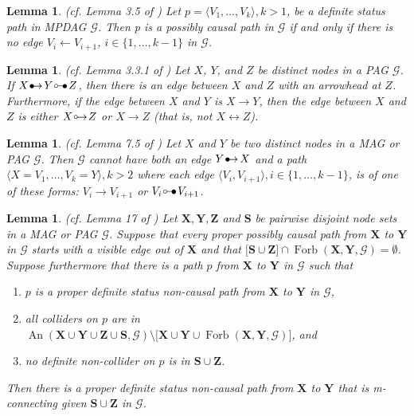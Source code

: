 \documentclass[twoside]{article}
\newtheorem{lemma}[theorem]{Lemma}
\DeclareMathOperator{\An}{An}
\DeclareMathOperator{\Forb}{Forb}
\newcommand{\fb}[2][X,Y]{\Forb(\mb{#1},#2)}
\newcommand{\mb}[1]{\mathbf{#1}}
\newcommand{\g}[1][G]{\mathcal{#1}}
\newcommand{\circbullet}{
  \setlength{\unitlength}{1mm}
  \begin{picture}(5,1)(0,0)
    \put(1,1){\circle{1}}
    \put(1.5,1){\line(1,0){2.4}}
    \put(2.9,0){$\bullet$}
  \end{picture}
}
\newcommand{\bulletarrow}{
  \setlength{\unitlength}{1mm}
  \begin{picture}(5,1)(0,0)
    \put(0.2,0){$\bullet$}
    \put(1,0){$\rightarrow$}
  \end{picture}
}
\newcommand{\circarrow}{
  \setlength{\unitlength}{1mm}
  \begin{picture}(5,1)(0,0)
    \put(1,1){\circle{1}}
    \put(1.2,0){$\rightarrow$}
  \end{picture}
}
\begin{document}
\begin{lemma}
\label{lem:perkovic17-35}
{\normalfont (cf. Lemma 3.5 of \citealp{perkovic2017interpreting})}
    Let $p = \langle V_1, \dots, V_k \rangle, k > 1$, be a definite status path in MPDAG $\g$. Then p is a possibly causal path in $\g$ if and only if there is no edge $V_i \leftarrow V_{i+1}$, $i \in \{1, \dots, k-1\}$ in $\g$.
\end{lemma}


\begin{lemma}
\label{lem:basic-property-pags}
{\normalfont (cf. Lemma 3.3.1 of \citealp{zhang2006causal})}
    Let $X$, $Y$, and $Z$ be distinct nodes in a PAG $\g$. If $X \bulletarrow Y \circbullet Z$, then there is an edge between $X$ and $Z$ with an arrowhead at $Z$. Furthermore, if the edge between $X$ and $Y$ is $X \rightarrow Y$, then the edge between $X$ and $Z$ is either $X \circarrow Z$ or $X \rightarrow Z$ (that is, not $X \leftrightarrow Z$).
\end{lemma}


\begin{lemma}
\label{lem:marl-cycle}
{\normalfont (cf. Lemma 7.5 of \citealp{maathuis2015generalized})}
    Let $X$ and $Y$ be two distinct nodes in a  MAG or PAG $\g$. Then $\g$ cannot have  both an edge $Y \bulletarrow X$ and a path $\langle X = V_1,\dots, V_k = Y \rangle, k>2$ where each edge $\langle V_i, V_{i+1} \rangle, i \in \{1, \dots, k-1\}$, is of one of these forms: $V_i \to V_{i+1}$ or $V_{i} \circbullet V_{i+1}$.
\end{lemma}


\begin{lemma}
\label{lem:richprime2}
{\normalfont (cf. Lemma 17 of \citealp{perkovic2018complete})}
    Let $\mb{X,Y, Z}$ and $\mb{S}$ be pairwise disjoint node sets in a MAG or PAG $\g$. Suppose  that every proper possibly causal path from $\mb{X}$ to $\mb{Y}$ in $\g$ starts with a visible edge out of $\mb{X}$ and that $\big[\mb{S} \cup \mb{Z} \big] \cap \fb{\g} = \emptyset$. Suppose furthermore that there is a path $p$ from $\mb{X}$ to $\mb{Y}$ in $\g$ such that
    \begin{enumerate}[label=(\roman*)]
        \item $p$ is a proper definite status non-causal path from $\mb{X}$ to $\mb{Y}$ in $\g$,
        \item all colliders on $p$ are in $\An(\mb{X} \cup \mb{Y} \cup \mb{Z} \cup \mb{S}, \g) \setminus \big[ \mb{X} \cup \mb{Y} \cup \fb{\g}\big]$, and
        \item no definite non-collider on $p$ is in $\mb{S} \cup \mb{Z}$.
    \end{enumerate}
    Then there is a proper definite status non-causal path from $\mb{X}$ to $\mb{Y}$ that is m-connecting given $\mb{S} \cup \mb{Z}$ in $\g$.
\end{lemma}
\end{document}
